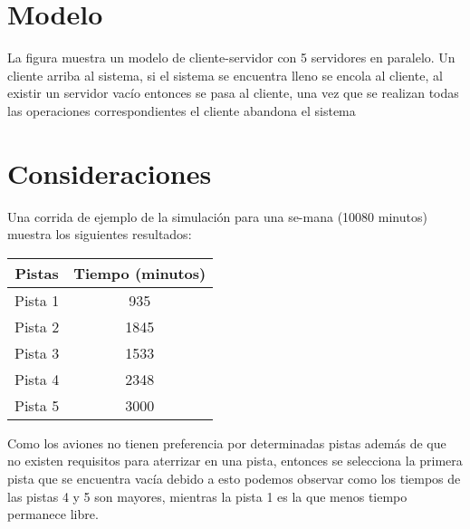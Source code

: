 \documentclass[a4paper,10pt,twocolumn]{article}
\begin{document}
\section{Modelo}\label{sub:listings}
		
		La figura muestra un modelo de cliente-servidor con 5 servidores en paralelo.
		Un cliente arriba al sistema, si el sistema se encuentra lleno se encola al
		cliente, al existir un servidor vac\'io entonces se pasa al cliente, una vez
		que se realizan todas las operaciones correspondientes el cliente abandona el
		sistema
		
		\begin{figure}[htb]%
			\begin{center}
			\end{center}
		\end{figure}

\section{Consideraciones}

	
	Una corrida de ejemplo de la simulaci\'on para una 
	se-mana (10080 minutos) muestra los siguientes resultados:
	\begin{center}
		\begin{tabular}[t]{|c|c|}
			\hline
			Pistas & Tiempo (minutos) \\ \hline
			Pista 1 & 935 \\ \hline
			Pista 2 & 1845 \\ \hline
			Pista 3 & 1533 \\ \hline
			Pista 4 & 2348 \\ \hline
			Pista 5 & 3000 \\ \hline
		\end{tabular}
	\end{center}

	Como los aviones no tienen preferencia por determinadas pistas adem\'as de que
	no existen requisitos para aterrizar en una pista, entonces se selecciona la primera
	pista que se encuentra vac\'ia debido a esto podemos observar como los tiempos de las
	pistas 4 y 5 son mayores, mientras la pista 1 es la que menos tiempo permanece libre.\\
\end{document}
